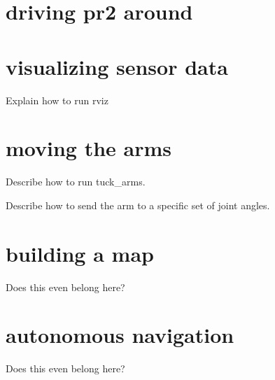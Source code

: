 \section{driving pr2 around}
\section{visualizing sensor data}
Explain how to run rviz
\section{moving the arms}
Describe how to run tuck\_arms.

Describe how to send the arm to a specific set of joint angles.
\section{building a map}
Does this even belong here?
\section{autonomous navigation}
Does this even belong here?
